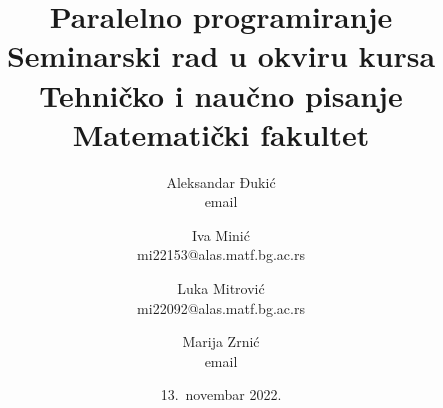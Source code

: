\documentclass[a4paper]{article}
\begin{document}
	
	\title{Paralelno programiranje\\ \small{Seminarski rad u okviru kursa\\Tehničko i naučno pisanje\\ Matematički fakultet}}
	
	\author
	{
		Aleksandar Đukić\\email
		\and
		Iva Minić\\mi22153@alas.matf.bg.ac.rs
		\and
		Luka Mitrović\\mi22092@alas.matf.bg.ac.rs
		\and
		Marija Zrnić\\email
	}
	
	\date{13.~novembar 2022.}
	\maketitle
	
\end{document}
